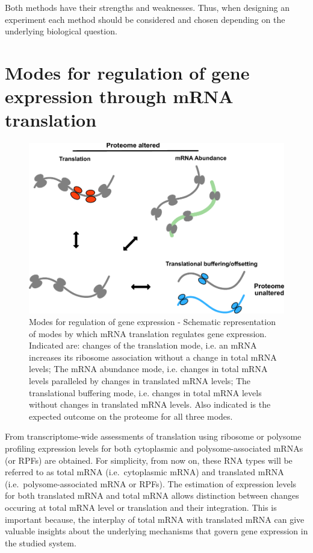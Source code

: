 \documentclass[12pt,openany]{book}
\begin{document}
Both methods have their strengths and weaknesses. Thus, when designing
an experiment each method should be considered and chosen depending on
the underlying biological question. \newline
\section{Modes for regulation of gene expression through mRNA translation} \label{modes}

\begin{figure}
  \includegraphics{./figures/geneModes_MRNA.pdf}
  \caption{Modes for regulation of gene expression - Schematic representation of modes by which mRNA translation regulates gene expression. Indicated are: changes of the translation mode, i.e. an mRNA increases its ribosome association without a change in total mRNA levels; The mRNA abundance mode, i.e. changes in total mRNA levels paralleled by changes in translated mRNA levels; The translational buffering mode, i.e. changes in total mRNA levels without changes in translated mRNA levels. Also indicated is the expected outcome on the proteome for all three modes. \label{fig:modes}}
\end{figure}

From transcriptome-wide assessments of translation using ribosome or
polysome profiling expression levels for both cytoplasmic and
polysome-associated mRNAs (or RPFs) are obtained. For simplicity, from
now on, these RNA types will be referred to as total mRNA
(i.e.~cytoplasmic mRNA) and translated mRNA (i.e.~polysome-associated
mRNA or RPFs). The estimation of expression levels for both translated
mRNA and total mRNA allows distinction between changes occuring at total
mRNA level or translation and their integration. This is important
because, the interplay of total mRNA with translated mRNA can give
valuable insights about the underlying mechanisms that govern gene
expression in the studied system.
\end{document}
